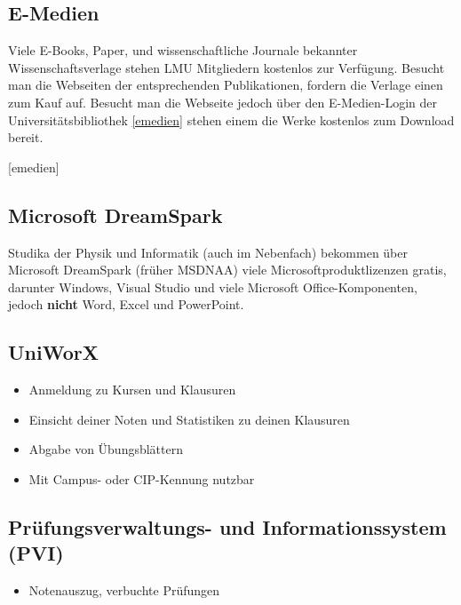 \subsection*{E-Medien}
Viele E-Books, Paper, und wissenschaftliche Journale bekannter Wissenschaftsverlage stehen LMU Mitgliedern kostenlos zur Verfügung.
Besucht man die Webseiten der entsprechenden Publikationen, fordern die Verlage einen zum Kauf auf.
Besucht man die Webseite jedoch über den E-Medien-Login der Universitätsbibliothek \ref{emedien} stehen einem die Werke kostenlos zum Download bereit.
\begin{urlList}
	[emedien]
\end{urlList}

\subsection*{Microsoft DreamSpark \subjectList{\subjectI{}\subjectMI{}\subjectP{}}}
Studika der Physik und Informatik (auch im Nebenfach) bekommen über
Microsoft DreamSpark (früher MSDNAA) viele Microsoftproduktlizenzen
gratis, darunter Windows, Visual Studio und viele
Microsoft Office-Komponenten, jedoch \textbf{nicht} Word, Excel und PowerPoint.

\begin{urlList}
\end{urlList}

\subsection*{UniWorX\subjectList{\subjectI{}\subjectMI{}}}
\begin{itemize}
	\item Anmeldung zu Kursen und Klausuren
	\item Einsicht deiner Noten und Statistiken zu deinen Klausuren
	\item Abgabe von Übungsblättern
	\item Mit Campus- oder CIP-Kennung nutzbar
\end{itemize}
\begin{urlList}
\end{urlList}

\subsection*{Prüfungsverwaltungs- und Informationssystem (PVI)\subjectList{\subjectI{}\subjectMI{}}}
\begin{itemize}
	\item Notenauszug, verbuchte Prüfungen
\end{itemize}
\begin{urlList}
\end{urlList}




